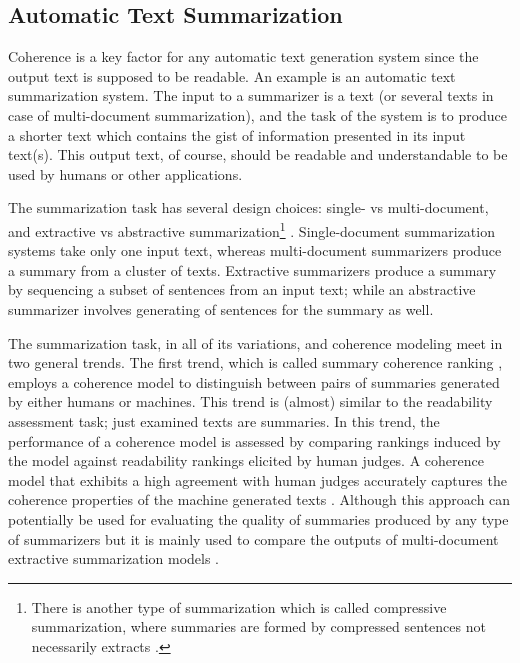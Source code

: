 \subsection{Automatic Text Summarization}

Coherence is a key factor for any automatic text generation system since the output text is supposed to be readable. 
An example is an automatic text summarization system.
The input to a summarizer is a text (or several texts in case of multi-document summarization), and the task of the system is to produce a shorter text which contains the gist of information presented in its input text(s). 
This output text, of course, should be readable and understandable to be used by humans or other applications. 

The summarization task has several design choices: single- vs multi-document, and extractive vs abstractive summarization\footnote{There is another type of summarization which is called compressive summarization, where summaries are formed by compressed sentences not necessarily extracts \cite{knight00}.} \cite{hahn00}. 
Single-document summarization systems take only one input text, whereas multi-document summarizers produce a summary from a cluster of texts. 
Extractive summarizers \cite{kupiec95,carbonell98,gillick09} produce a summary by sequencing a subset of sentences from an input text; while an abstractive summarizer \cite{wanglu13b,alfonseca13} involves generating of sentences for the summary as well.   

The summarization task, in all of its variations, and coherence modeling meet in two general trends. 
The first trend, which is called summary coherence ranking \cite{barzilay08,guinaudeau13}, employs a coherence model to distinguish between pairs of summaries generated by either humans or machines. 
This trend is (almost) similar to the readability assessment task; just examined texts are summaries. 
In this trend, the performance of a coherence model is assessed by comparing rankings induced by the model against readability rankings elicited by human judges. 
A coherence model that exhibits a high agreement with human judges accurately captures the coherence properties of the machine generated texts \cite{barzilay08}. 
Although this approach can potentially be used for evaluating the quality of summaries produced by any type of summarizers but it is mainly used to compare the outputs of multi-document extractive summarization models \cite{barzilay08}. 

